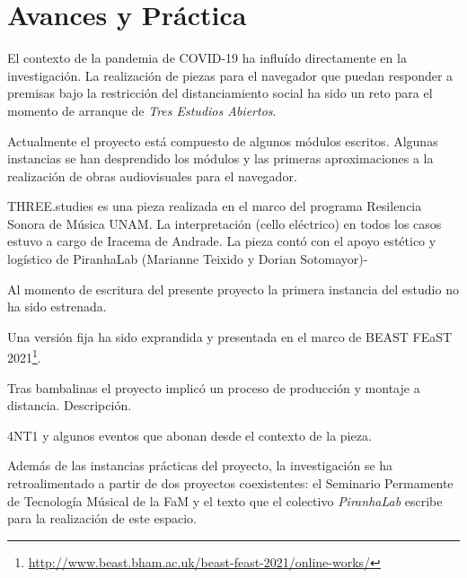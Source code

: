 \section*{Avances y Práctica}

El contexto de la pandemia de COVID-19 ha influído directamente en la investigación. La realización de piezas para el navegador que puedan responder a premisas bajo la restricción del distanciamiento social ha sido un reto para el momento de arranque de \textit{Tres Estudios Abiertos}. 

Actualmente el proyecto está compuesto de algunos módulos escritos. Algunas instancias se han desprendido los módulos y las primeras aproximaciones a la realización de obras audiovisuales para el navegador.

THREE.studies es una pieza realizada en el marco del programa Resilencia Sonora de Música UNAM. La interpretación (cello eléctrico) en todos los casos estuvo a cargo de Iracema de Andrade. La pieza contó con el apoyo estético y logístico de PiranhaLab (Marianne Teixido y Dorian Sotomayor)- 

Al momento de escritura del presente proyecto la primera instancia del estudio no ha sido estrenada.

Una versión fija ha sido exprandida y presentada en el marco de  BEAST FEaST 2021\footnote{\url{http://www.beast.bham.ac.uk/beast-feast-2021/online-works/}}.

Tras bambalinas el proyecto implicó un proceso de producción y montaje a distancia. Descripción. 

4NT1 y algunos eventos que abonan desde el contexto de la pieza. 

Además de las instancias prácticas del proyecto, la investigación se ha retroalimentado a partir de dos proyectos coexistentes: el Seminario Permamente de Tecnología Músical de la FaM y el texto que el colectivo \textit{PiranhaLab} escribe para la realización de este espacio.

